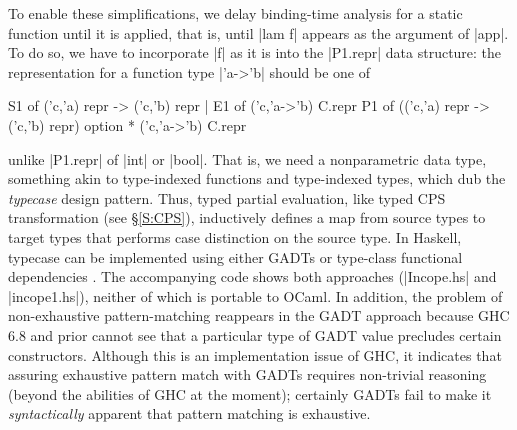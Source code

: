 To enable these simplifications, we delay binding-time analysis
for a static function until it is applied, that is, until |lam f|
appears as the argument of |app|.  To do so, we have to incorporate |f|
as it is into the |P1.repr| data structure: the representation
for a function type |'a->'b| should be one of
\begin{code}
S1 of ('c,'a) repr -> ('c,'b) repr | E1 of ('c,'a->'b) C.repr
P1 of (('c,'a) repr -> ('c,'b) repr) option * ('c,'a->'b) C.repr
\end{code}
unlike |P1.repr| of |int| or |bool|.
That is, we need a nonparametric data type, something akin to
type-indexed functions and type-indexed types, which
\citet{oliveira-typecase} dub the \emph{typecase} design pattern.
Thus, typed partial evaluation, like typed CPS transformation
(see \S\ref{S:CPS}),
inductively defines a map from source types to target types that
performs case distinction on the source type. In Haskell, typecase
can be implemented using either GADTs or
type-class functional dependencies
\citep{oliveira-typecase}. The accompanying code shows both
approaches (|Incope.hs| and |incope1.hs|), 
neither of which is portable to OCaml. In addition,
the problem of non\hyp exhaustive pattern\hyp matching reappears in
the GADT approach because GHC 6.8 and prior cannot see that a particular
type of GADT value precludes certain constructors. Although this
is an implementation issue of GHC,
it indicates that assuring exhaustive pattern match with GADTs
requires non-trivial reasoning (beyond the abilities of GHC at the moment);
certainly GADTs fail to
make it \emph{syntactically} apparent that pattern matching is exhaustive.



